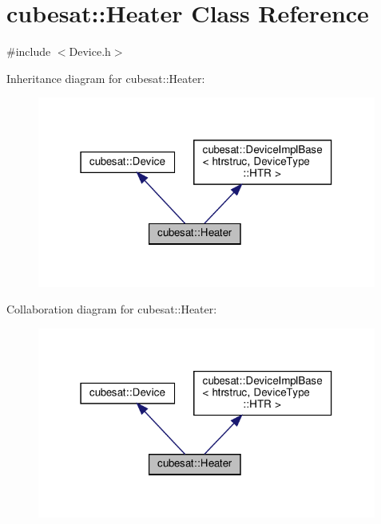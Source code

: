 \hypertarget{classcubesat_1_1Heater}{}\section{cubesat\+:\+:Heater Class Reference}
\label{classcubesat_1_1Heater}


{\ttfamily \#include $<$Device.\+h$>$}



Inheritance diagram for cubesat\+:\+:Heater\+:
\nopagebreak
\begin{figure}[H]
\begin{center}
\leavevmode
\includegraphics[width=316pt]{classcubesat_1_1Heater__inherit__graph}
\end{center}
\end{figure}


Collaboration diagram for cubesat\+:\+:Heater\+:
\nopagebreak
\begin{figure}[H]
\begin{center}
\leavevmode
\includegraphics[width=316pt]{classcubesat_1_1Heater__coll__graph}
\end{center}
\end{figure}
